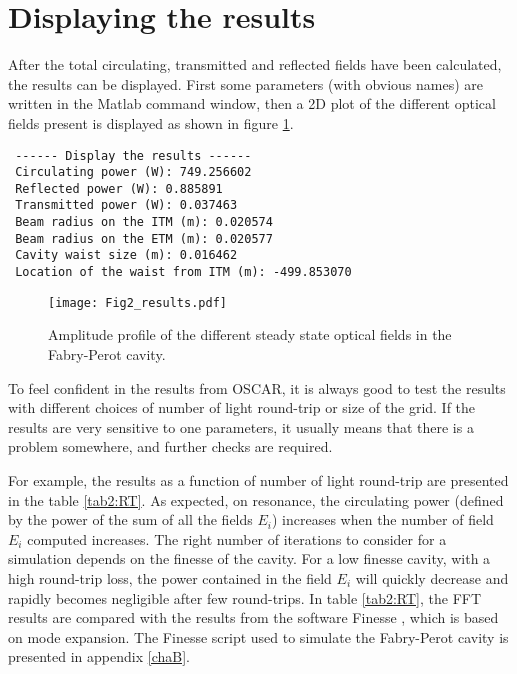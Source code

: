 \section{Displaying the results}
\label{sec2:5}
After the total circulating, transmitted and reflected fields have been calculated, the results can be displayed. First some parameters (with obvious names) are written in the Matlab command window, then a 2D plot of the different optical fields present is displayed as shown in figure \ref{fig2:display}.

\begin{verbatim}
 ------ Display the results ------
 Circulating power (W): 749.256602
 Reflected power (W): 0.885891
 Transmitted power (W): 0.037463
 Beam radius on the ITM (m): 0.020574
 Beam radius on the ETM (m): 0.020577
 Cavity waist size (m): 0.016462
 Location of the waist from ITM (m): -499.853070
\end{verbatim}

\begin{figure}
\begin{center}
\texttt{[image: Fig2\_results.pdf]}
\end{center}
\caption{\label{fig2:display} Amplitude profile of the different steady state optical fields in the Fabry-Perot cavity. }
\end{figure}

To feel confident in the results from OSCAR, it is always good to test the results with different choices of number of light round-trip or size of the grid. If the results are very sensitive to one parameters, it usually means that there is a problem somewhere, and further checks are required.

For example, the results as a function of number of light round-trip are presented in the table \ref{tab2:RT}. As expected, on resonance, the circulating power (defined by the power of the sum of all the fields $E_i$) increases when the number of field $E_i$ computed increases. The right number of iterations to consider for a simulation depends on the finesse of the cavity. For a low finesse cavity, with a high round-trip loss, the power contained in the field $E_i$ will quickly decrease and rapidly becomes negligible after few round-trips. In table \ref{tab2:RT}, the FFT results are compared with the results from the software Finesse \cite{Finesse}, which is based on mode expansion. The Finesse script used to simulate the Fabry-Perot cavity is presented in appendix \ref{chaB}.\\

